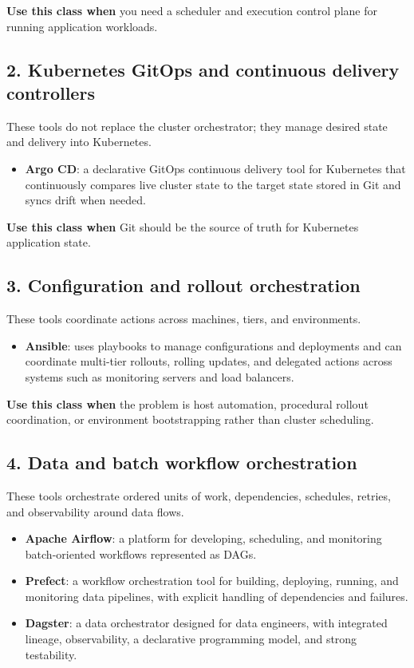 \documentclass[11pt]{article}
\begin{document}
\textbf{Use this class when} you need a scheduler and execution control plane for running application workloads.

\subsection{2. Kubernetes GitOps and continuous delivery controllers}
These tools do not replace the cluster orchestrator; they manage desired state and delivery into Kubernetes.
\begin{itemize}
    \item \textbf{Argo CD}: a declarative GitOps continuous delivery tool for Kubernetes that continuously compares live cluster state to the target state stored in Git and syncs drift when needed.\cite{ArgoCDHome,ArgoCDDeclarative}
\end{itemize}

\textbf{Use this class when} Git should be the source of truth for Kubernetes application state.

\subsection{3. Configuration and rollout orchestration}
These tools coordinate actions across machines, tiers, and environments.
\begin{itemize}
    \item \textbf{Ansible}: uses playbooks to manage configurations and deployments and can coordinate multi-tier rollouts, rolling updates, and delegated actions across systems such as monitoring servers and load balancers.\cite{AnsiblePlaybooks,AnsibleRolling}
\end{itemize}

\textbf{Use this class when} the problem is host automation, procedural rollout coordination, or environment bootstrapping rather than cluster scheduling.

\subsection{4. Data and batch workflow orchestration}
These tools orchestrate ordered units of work, dependencies, schedules, retries, and observability around data flows.
\begin{itemize}
    \item \textbf{Apache Airflow}: a platform for developing, scheduling, and monitoring batch-oriented workflows represented as DAGs.\cite{AirflowHome,AirflowArchitecture}
    \item \textbf{Prefect}: a workflow orchestration tool for building, deploying, running, and monitoring data pipelines, with explicit handling of dependencies and failures.\cite{PrefectQuickstart}
    \item \textbf{Dagster}: a data orchestrator designed for data engineers, with integrated lineage, observability, a declarative programming model, and strong testability.\cite{DagsterOverview}
\end{itemize}
\end{document}
